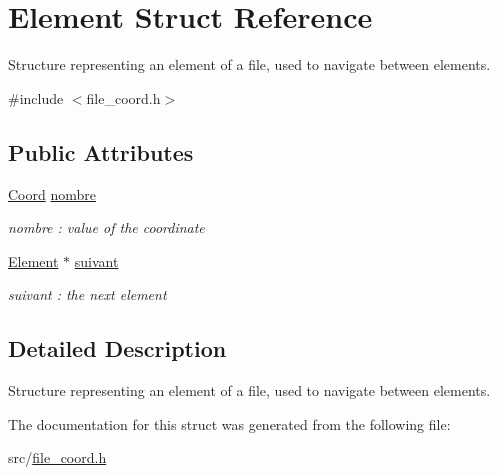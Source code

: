 \hypertarget{struct_element}{}\section{Element Struct Reference}
\label{struct_element}


Structure representing an element of a file, used to navigate between elements.  




{\ttfamily \#include $<$file\+\_\+coord.\+h$>$}

\subsection*{Public Attributes}
\begin{DoxyCompactItemize}
\item 
\mbox{\label{struct_element_ab7c5aa9b5725c766092e752d347c0eec}} 
\hyperlink{struct_coord}{Coord} \hyperlink{struct_element_ab7c5aa9b5725c766092e752d347c0eec}{nombre}
\begin{DoxyCompactList}\small\item\em nombre \+: value of the coordinate \end{DoxyCompactList}\item 
\mbox{\label{struct_element_a01119a1a4624f90db9ffd8bd20eea0db}} 
\hyperlink{struct_element}{Element} $\ast$ \hyperlink{struct_element_a01119a1a4624f90db9ffd8bd20eea0db}{suivant}
\begin{DoxyCompactList}\small\item\em suivant \+: the next element \end{DoxyCompactList}\end{DoxyCompactItemize}


\subsection{Detailed Description}
Structure representing an element of a file, used to navigate between elements. 

The documentation for this struct was generated from the following file\+:\begin{DoxyCompactItemize}
\item 
src/\hyperlink{file__coord_8h}{file\+\_\+coord.\+h}\end{DoxyCompactItemize}
